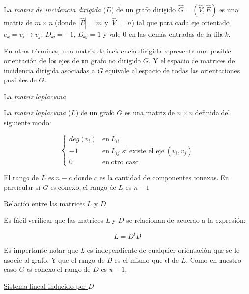 \documentclass[a4paper,11pt]{article}
\begin{document}
\bigskip

La \textit{matriz de incidencia dirigida} ($D$) de un grafo dirigido 
$\hat G = (\hat V, \hat E)$ es una matriz de $m \times n$ (donde $|\hat
 E| = m$ y $|\hat V| = n$) tal que para cada eje orientado 
$e_k=v_i \rightarrow v_j$: $D_{ki} = -1$, $D_{kj} = 1$ y vale $0$ en 
las demás entradas de la fila $k$.

\bigskip

En otros términos, una matriz de incidencia dirigida representa una 
posible orientación de los ejes de un grafo no dirigido $G$. Y el 
espacio de matrices de incidencia dirigida asociadas a $G$ 
equivale al espacio de todas las orientaciones posibles de $G$.

\bigskip

\underline{La \textit{matriz laplaciana}}

\bigskip

La \textit{matriz laplaciana} ($L$) de un grafo $G$ es una matriz de 
$n \times n$ definida del siguiente modo:

\bigskip

\begin{equation}
	\begin{cases}
	deg(v_i) & \text{en $L_{ii}$} \\
	-1 & \text{en $L_{ij}$ si existe el eje $(v_i,v_j)$} \\
	0 & \text{en otro caso} 
	\end{cases}
\end{equation}

\bigskip

El rango de $L$ es $n-c$ donde $c$ es la cantidad de componentes 
conexas. En particular si $G$ es conexo, el rango de $L$ es $n-1$

\bigskip

\underline{Relación entre las matrices $L$ y $D$}

\bigskip

Es fácil verificar que las matrices $L$ y $D$ se relacionan de acuerdo
a la expresión:

$$L = D^t D$$

Es importante notar que $L$ es independiente de cualquier orientación 
que se le asocie al grafo. Y que el rango de $D$ es el mismo que el de 
$L$. Como en nuestro caso $G$ es conexo el rango de $D$ es $n-1$.

\bigskip

\underline{Sistema lineal inducido por $D$}

\bigskip
\end{document}
